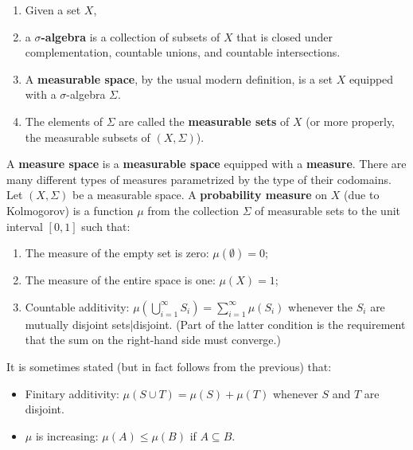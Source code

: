 \begin{frame}
\begin{enumerate}
\item Given a set $X$, 
\item a \textbf{$\sigma$-algebra} is a collection of subsets of $X$ that is closed under complementation, countable unions, and countable intersections. 
\item A \textbf{measurable space}, by the usual modern definition, is a set $X$ equipped with a $\sigma$-algebra $\Sigma$. 
\item The elements of $\Sigma$ are called the \textbf{measurable sets} of $X$ (or more properly, the measurable subsets of $(X,\Sigma)$). \cite{Teh2006}
\end{enumerate}
\end{frame}

\begin{frame}
A \textbf{measure space} is a \textbf{measurable space} equipped with a \textbf{measure}. There are many different types of measures parametrized by the type of their codomains. Let $(X, \Sigma)$ be a measurable space. A \textbf{probability measure} on $X$ (due to Kolmogorov) is a function $\mu$ from the collection $\Sigma$ of measurable sets to the unit interval $[0,1]$ such that:

\begin{enumerate}%
\item The measure of the empty set is zero: $\mu(\emptyset) = 0$;
\item The measure of the entire space is one: $\mu(X) = 1$;
\item Countable additivity: $\mu(\bigcup_{i = 1}^{\infty} S_i) = \sum_{i=1}^{\infty} \mu(S_i)$ whenever the $S_i$ are mutually disjoint sets|disjoint.
(Part of the latter condition is the requirement that the sum on the right-hand side must converge.)
\end{enumerate}
\end{frame}

\begin{frame}
It is sometimes stated (but in fact follows from the previous) that:

\begin{itemize}%
\item Finitary additivity: $\mu(S \cup T) = \mu(S) + \mu(T)$ whenever $S$ and $T$ are disjoint.
\item $\mu$ is increasing: $\mu(A) \leq \mu(B)$ if $A \subseteq B$.

\end{itemize}
\end{frame}


